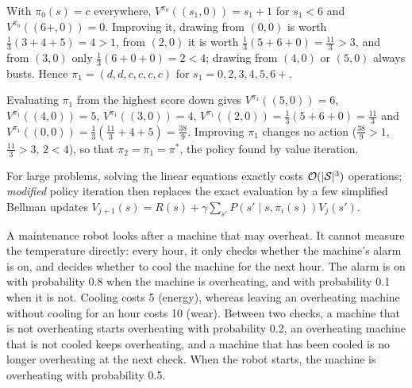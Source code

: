 \documentclass[11pt, a4paper]{exam}
\begin{document}
\begin{exercises}
\begin{parts}
\begin{solution}
\begin{itemize}
            With $\pi_0(s) = c$ everywhere, $V^{\pi_0}((s_1, 0)) = s_1 + 1$ for $s_1 < 6$ and $V^{\pi_0}((6{+}, 0)) = 0$. Improving it, drawing from $(0, 0)$ is worth $\frac{1}{3}(3 + 4 + 5) = 4 > 1$, from $(2, 0)$ it is worth $\frac{1}{3}(5 + 6 + 0) = \frac{11}{3} > 3$, and from $(3, 0)$ only $\frac{1}{3}(6 + 0 + 0) = 2 < 4$; drawing from $(4, 0)$ or $(5, 0)$ always busts. Hence $\pi_1 = (d, d, c, c, c, c)$ for $s_1 = 0, 2, 3, 4, 5, 6{+}$.

            Evaluating $\pi_1$ from the highest score down gives $V^{\pi_1}((5, 0)) = 6$, $V^{\pi_1}((4, 0)) = 5$, $V^{\pi_1}((3, 0)) = 4$, $V^{\pi_1}((2, 0)) = \frac{1}{3}(5 + 6 + 0) = \frac{11}{3}$ and $V^{\pi_1}((0, 0)) = \frac{1}{3}(\frac{11}{3} + 4 + 5) = \frac{38}{9}$. Improving $\pi_1$ changes no action ($\frac{38}{9} > 1$, $\frac{11}{3} > 3$, $2 < 4$), so that $\pi_2 = \pi_1 = \pi^*$, the policy found by value iteration.

            For large problems, solving the linear equations exactly costs $\mathcal{O}(\lvert\mathcal{S}\rvert^3)$ operations; \emph{modified} policy iteration then replaces the exact evaluation by a few simplified Bellman updates $V_{j+1}(s) = R(s) + \gamma \sum_{s'} P(s' \mid s, \pi_i(s)) V_j(s')$.
        \end{itemize}
    \end{solution}
\end{parts}


A maintenance robot looks after a machine that may overheat. It cannot measure the temperature directly: every hour, it only checks whether the machine's alarm is on, and decides whether to cool the machine for the next hour. The alarm is on with probability 0.8 when the machine is overheating, and with probability 0.1 when it is not. Cooling costs 5 (energy), whereas leaving an overheating machine without cooling for an hour costs 10 (wear). Between two checks, a machine that is not overheating starts overheating with probability 0.2, an overheating machine that is not cooled keeps overheating, and a machine that has been cooled is no longer overheating at the next check. When the robot starts, the machine is overheating with probability 0.5.

\end{exercises}
\end{document}
